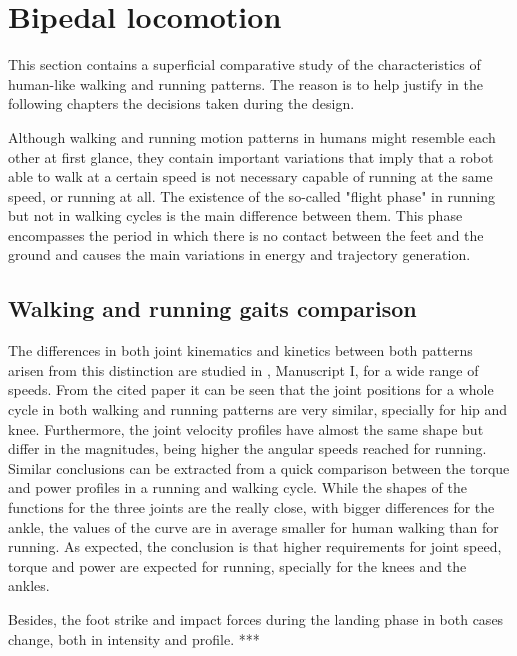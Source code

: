 
\section{Bipedal locomotion} %
\label{sec:bipedal_walking_and_running_gaits}
This section contains a superficial comparative study of the characteristics of human-like walking and running patterns.
The reason is to help justify in the following chapters the decisions taken during the design.

Although walking and running motion patterns in humans might resemble each other at first glance, they contain important variations that imply that a robot able to walk at a certain speed is not necessary capable of running at the same speed, or running at all.
The existence of the so-called "flight phase" in running but not in walking cycles is the main difference between them.
This phase encompasses the period in which there is no contact between the feet and the ground and causes the main variations in energy and trajectory generation.

\subsection{Walking and running gaits comparison} %
\label{sub:walk_and_run_comparison}
The differences in both joint kinematics and kinetics between both patterns arisen from this distinction are studied in \cite{grimmer}, Manuscript I, for a wide range of speeds.
From the cited paper it can be seen that the joint positions for a whole cycle in both walking and running patterns are very similar, specially for hip and knee.
Furthermore, the joint velocity profiles have almost the same shape but differ in the magnitudes, being higher the angular speeds reached for running.
Similar conclusions can be extracted from a quick comparison between the torque and power profiles in a running and walking cycle.
While the shapes of the functions for the three joints are the really close, with bigger differences for the ankle, the values of the curve are in average smaller for human walking than for running.
As expected, the conclusion is that higher requirements for joint speed, torque and power are expected for running, specially for the knees and the ankles.

Besides, the foot strike and impact forces during the landing phase in both cases change, both in intensity and profile. *** 


